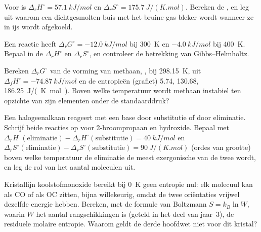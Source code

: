 \begin{exercise}[$\star\star$]\label{exo:b2:reaction-free-energy:6}
Voor  is $\Delta_r H^\circ = \qty{57.1}{kJ/mol}$ en
$\Delta_r S^\circ = \qty{175.7}{J/(K.mol)}$. Bereken de
, en leg uit waarom een dichtgesmolten buis met het bruine gas  bleker wordt
wanneer ze in ijs wordt afgekoeld.
\end{exercise}

\begin{exercise}[$\star\star$]\label{exo:b2:reaction-free-energy:7}
Een reactie heeft $\Delta_r G^\circ = \qty{-12.0}{kJ/mol}$ bij \qty{300}{K}
en $\qty{-4.0}{kJ/mol}$ bij \qty{400}{K}. Bepaal in de 
$\Delta_r H^\circ$ en $\Delta_r S^\circ$, en controleer de
betrekking van Gibbs--Helmholtz.
\end{exercise}

\begin{exercise}[$\star\star$]\label{exo:b2:reaction-free-energy:8}
Bereken $\Delta_r G^\circ$ van de vorming van methaan, , bij \qty{298.15}{K}, uit $\Delta_f H^\circ = \qty{-74.87}{kJ/mol}$
en de entropieën  (grafiet) 5.74,  130.68, 
\qty{186.25}{J/(K.mol)}. Boven welke temperatuur wordt methaan
instabiel ten opzichte van zijn elementen onder de standaarddruk?
\end{exercise}

\begin{exercise}[$\star\star$]\label{exo:b2:reaction-free-energy:9}
Een halogeenalkaan reageert met een base door substitutie of door eliminatie. Schrijf
beide reacties op voor 2-broompropaan en hydroxide. Bepaal met $\Delta_r
H^\circ(\text{eliminatie}) - \Delta_r H^\circ(\text{substitutie}) =
\qty{+40}{kJ/mol}$ en $\Delta_r S^\circ(\text{eliminatie}) - \Delta_r
S^\circ(\text{substitutie}) = \qty{+90}{J/(K.mol)}$ (ordes van grootte)
boven welke temperatuur de eliminatie de meest exergonische van
de twee wordt, en leg de rol van het aantal moleculen uit.
\end{exercise}

\begin{exercise}[$\star\star\star$]\label{exo:b2:reaction-free-energy:10}
Kristallijn koolstofmonoxide bereikt bij \qty{0}{K} geen entropie nul: elk
molecuul kan als CO of als OC zitten, bijna willekeurig, omdat de twee oriëntaties
vrijwel dezelfde energie hebben. Bereken, met de formule van Boltzmann $S = k_B\ln W$, waarin
$W$ het aantal rangschikkingen is (geteld in het deel van jaar~3), de
residuele molaire entropie. Waarom geldt de derde hoofdwet niet voor dit
kristal?
\end{exercise}

